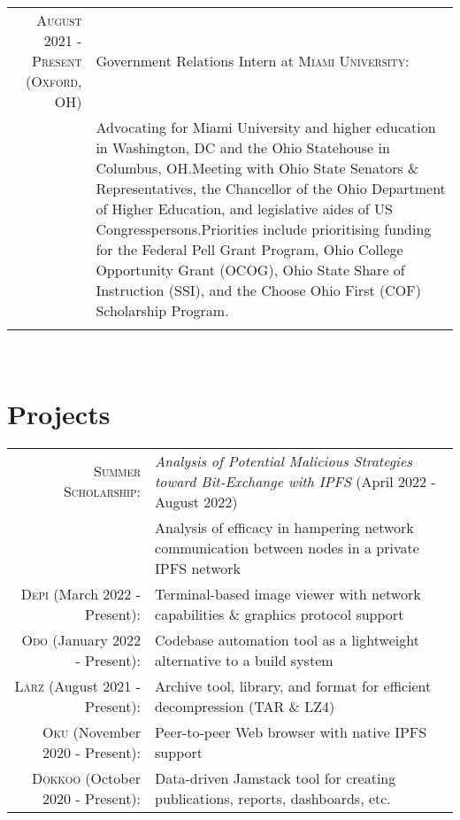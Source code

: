 \documentclass[letterpaper,8pt]{article} %
\begin{document}
{\begin{tabular}{r|p{12cm}}

\footnotesize{\textsc{August 2021 - Present (Oxford, OH)}} & \footnotesize{Government Relations Intern at \textsc{Miami University}}:\\
& \footnotesize{Advocating for Miami University and higher education in Washington, DC and the Ohio Statehouse in Columbus, OH.\@ Meeting with Ohio State Senators \& Representatives, the Chancellor of the Ohio Department of Higher Education, and legislative aides of US Congresspersons.\@ Priorities include prioritising funding for the Federal Pell Grant Program, Ohio College Opportunity Grant (OCOG), Ohio State Share of Instruction (SSI), and the Choose Ohio First (COF) Scholarship Program.}\\
\multicolumn{2}{c}{} \\


\end{tabular}}\normalsize\\


\section{Projects}

\begin{tabular}{rl}
\footnotesize\textsc{Summer Scholarship}: & \footnotesize\emph{Analysis of Potential Malicious Strategies toward Bit-Exchange with IPFS} \footnotesize{(April 2022 - August 2022)}\\
& \footnotesize{Analysis of efficacy in hampering network communication between nodes in a private IPFS network}\\
\textsc{Depi} \footnotesize{(March 2022 - Present)}: & \footnotesize{Terminal-based image viewer with network capabilities \& graphics protocol support}\\
\textsc{Odo} \footnotesize{(January 2022 - Present)}: & \footnotesize{Codebase automation tool as a lightweight alternative to a build system}\\
\textsc{Larz} \footnotesize{(August 2021 - Present)}: & \footnotesize{Archive tool, library, and format for efficient decompression (TAR \& LZ4)}\\
\textsc{Oku} \footnotesize{(November 2020 - Present)}: & \footnotesize{Peer-to-peer Web browser with native IPFS support}\\
\textsc{Dokkoo} \footnotesize{(October 2020 - Present)}: & \footnotesize{Data-driven Jamstack tool for creating publications, reports, dashboards, etc.}
\end{tabular}
\end{document}
